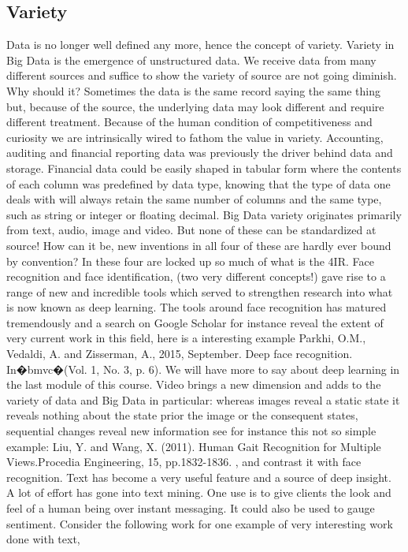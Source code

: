 \subsection{Variety}
Data is no longer well defined any more, hence the concept of variety.  Variety in Big Data is the emergence of unstructured data.  We receive data from many different sources and suffice to show the variety of source are not going diminish.  Why should it? Sometimes the data is the same record saying the same thing but, because of the source, the underlying data may look different and require different treatment.  Because of the human condition of competitiveness and curiosity we are intrinsically wired to fathom the value in variety.  Accounting, auditing and financial reporting data was previously the driver behind data and storage.  Financial data could be easily shaped in tabular form where the contents of each column was predefined by data type, knowing that the type of data one deals with will always retain the same number of columns and the same type, such as string or integer or floating decimal.  
Big Data variety originates primarily from text, audio, image and video.  But none of these can be standardized at source! How can it be, new inventions in all four of these are hardly ever bound by convention?  In these four are locked up so much of what is the 4IR.
 Face recognition and face identification, (two very different concepts!) gave rise to a range of new and incredible tools which served to strengthen research into what is now known as deep learning.
 The tools around face recognition has matured tremendously and a search on Google Scholar for instance reveal the extent of very current work in this field, here is a interesting example Parkhi, O.M., Vedaldi, A. and Zisserman, A., 2015, September. Deep face recognition. In�bmvc�(Vol. 1, No. 3, p. 6). We will have more to say about deep learning in the last module of this course.
 Video brings a new dimension and adds to the variety of data and Big Data in particular: whereas images reveal a static state it reveals nothing about the state prior the image or the consequent states, sequential changes reveal new information see for instance this not so simple example: Liu, Y. and Wang, X. (2011). Human Gait Recognition for Multiple Views.Procedia Engineering, 15, pp.1832-1836.  , and contrast it with face recognition.
 Text has become a very useful feature and a source of deep insight.  A lot of effort has gone into text mining.  One use is to give clients the look and feel of a human being over instant messaging.  It could also be used to gauge sentiment.  Consider the following work for one example of very interesting work done with text, \cite{Majumder2017}
